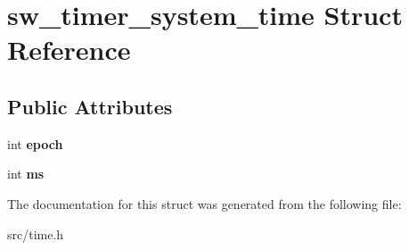 \hypertarget{structsw__timer__system__time}{}\section{sw\+\_\+timer\+\_\+system\+\_\+time Struct Reference}
\label{structsw__timer__system__time}
\subsection*{Public Attributes}
\begin{DoxyCompactItemize}
\item 
\hypertarget{structsw__timer__system__time_aa9f10bc219cafbf8c61f94fbb4138591}{}int {\bfseries epoch}\label{structsw__timer__system__time_aa9f10bc219cafbf8c61f94fbb4138591}

\item 
\hypertarget{structsw__timer__system__time_aafb47623ce45c3d1617e54d2025b679a}{}int {\bfseries ms}\label{structsw__timer__system__time_aafb47623ce45c3d1617e54d2025b679a}

\end{DoxyCompactItemize}


The documentation for this struct was generated from the following file\+:\begin{DoxyCompactItemize}
\item 
src/time.\+h\end{DoxyCompactItemize}
